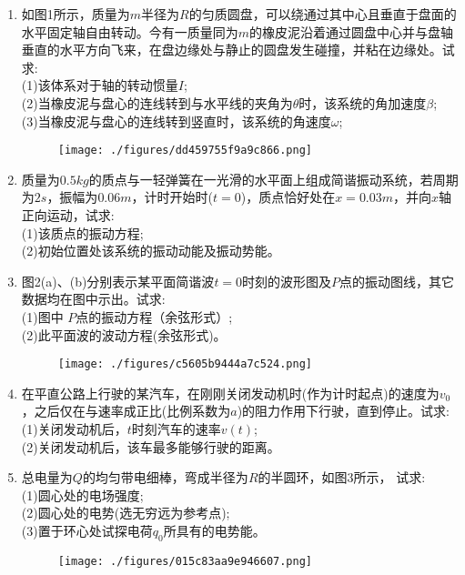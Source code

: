 
\begin{enumerate}
\item 如图1所示，质量为$m$半径为$R$的匀质圆盘，可以绕通过其中心且垂直于盘面的水平固定轴自由转动。今有一质量同为$m$的橡皮泥沿着通过圆盘中心并与盘轴垂直的水平方向飞来，在盘边缘处与静止的圆盘发生碰撞，并粘在边缘处。试求:\\
(1)该体系对于轴的转动惯量$I$;\\
(2)当橡皮泥与盘心的连线转到与水平线的夹角为$\theta$时，该系统的角加速度$\beta$;\\
(3)当橡皮泥与盘心的连线转到竖直时，该系统的角速度$\omega$;
\begin{figure}[ht]
\centering
\texttt{[image: ./figures/dd459755f9a9c866.png]}
\caption{} \label{fig_SD15_3}
\end{figure}
\item 质量为$0.5kg$的质点与一轻弹簧在一光滑的水平面上组成简谐振动系统，若周期为$2s$，振幅为$0.06m$，计时开始时($t=0$)，质点恰好处在$x=0.03m$，并向$x$轴正向运动，试求:\\
(1)该质点的振动方程;\\
(2)初始位置处该系统的振动动能及振动势能。
\item 图2(a)、(b)分别表示某平面简谐波$t=0$时刻的波形图及$ P$点的振动图线，其它数据均在图中示出。试求:\\
(1)图中 $P$点的振动方程（余弦形式）;\\
(2)此平面波的波动方程(余弦形式)。
\begin{figure}[ht]
\centering
\texttt{[image: ./figures/c5605b9444a7c524.png]}
\caption{} \label{fig_SD15_2}
\end{figure}
\item 在平直公路上行驶的某汽车，在刚刚关闭发动机时(作为计时起点)的速度为$ v_0$，之后仅在与速率成正比(比例系数为$a$)的阻力作用下行驶，直到停止。试求:\\
(1)关闭发动机后，$t$时刻汽车的速率$v(t)$;\\
(2)关闭发动机后，该车最多能够行驶的距离。
\item 总电量为$Q$的均匀带电细棒，弯成半径为$R$的半圆环，如图3所示，
试求:\\
(1)圆心处的电场强度;\\
(2)圆心处的电势(选无穷远为参考点);\\
(3)置于环心处试探电荷$q_0$所具有的电势能。
\begin{figure}[ht]
\centering
\texttt{[image: ./figures/015c83aa9e946607.png]}

\end{figure}
\end{enumerate}
